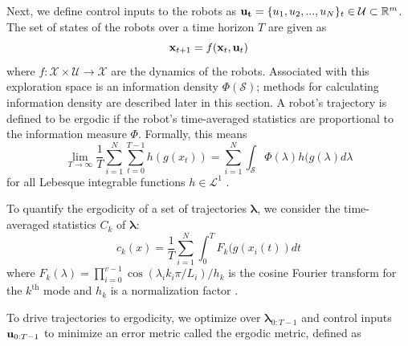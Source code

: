 \documentclass[letterpaper, 10 pt, conference]{ieeeconf}  %
\begin{document}
 Next, we define control inputs to the robots as $\bold{u_t} = \{u_1, u_2, ..., u_N\}_t \in \mathcal{U} \subset \mathbb{R}^m$. The set of states of the robots over a time horizon $T$ are given as
\begin{equation}
    \bold{x}_{t+1} = f(\bold{x}_t, \bold{u}_t)
\end{equation}
where $f: \mathcal{X}\times \mathcal{U} \to \mathcal{X}$ are the dynamics of the robots. Associated with this exploration space is an information density $\Phi(\mathcal{S})$; methods for calculating information density are described later in this section. A robot's trajectory is defined to be ergodic if the robot's time-averaged statistics are proportional to the information measure $\Phi$. Formally, this means
\begin{equation} \label{eq:ergodicity}
    \lim_{T\to \infty} \frac{1}{T}\sum_{i=1}^{N}\sum_{t=0}^{T-1} h(g({x}_t)) = \sum_{i=1}^{N}\int_\mathcal{S} \Phi(\lambda)h(g(\lambda) d\lambda
\end{equation}
for all Lebesque integrable functions $h \in \mathcal{L}^1$ \cite{de2016ergodic}.

To quantify the ergodicity of a set of trajectories $\boldsymbol{\lambda}$, we consider the time-averaged statistics $C_k$ of $\boldsymbol{\lambda}$:
\begin{equation} \label{eq:time_avg_stat}
c_k(x) = \frac{1}{T} \sum_{i=1}^{N}\int_0^TF_k(g(x_i(t))dt
\end{equation}
where $F_k(\lambda) = \prod_{i=0}^{v-1} \cos(\lambda_i k_i \pi/ L_i)/h_k$ is the cosine Fourier transform for the $k^\text{th}$ mode and $h_k$ is a normalization factor \cite{7350162}.

To drive trajectories to ergodicity, we optimize over $\boldsymbol{\lambda}_{0:T-1}$ and control inputs $\bold{u}_{0:T-1}$ to minimize an error metric called the ergodic metric, defined as
\end{document}
